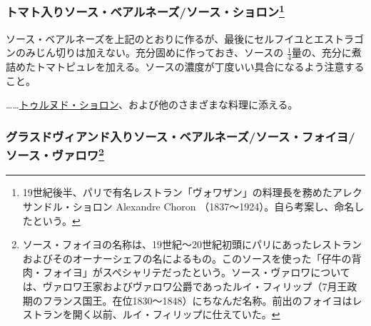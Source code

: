 \begin{recette}
\atoaki{}

\hypertarget{sauce-bearnaise-tomatee}{%
\subsubsection[トマト入りソース・ベアルネーズ/ソース・ショロン]{\texorpdfstring{トマト入りソース・ベアルネーズ/ソース・ショロン\footnote{19世紀後半、パリで有名レストラン「ヴォワザン」の料理長を務めたアレクサンドル・ショロン
  Alexandre Choron （1837〜1924）。自ら考案し、命名したという。}}{トマト入りソース・ベアルネーズ/ソース・ショロン}}\label{sauce-bearnaise-tomatee}}


 

ソース・ベアルネーズを上記のとおりに作るが、最後にセルフイユとエストラゴンのみじん切りは加えない。充分固めに作っておき、ソースの
\(\frac{1}{4}\)量の、充分に煮詰めたトマトピュレを加える。ソースの濃度が丁度いい具合になるよう注意すること。

\ldots{}\ldots{}\protect\hyperlink{tournedos-choron}{トゥルヌド・ショロン}、および他のさまざまな料理に添える。

\atoaki{}

\hypertarget{sauce-bearnaise-glace-de-viande}{%
\subsubsection[グラスドヴィアンド入りソース・ベアルネーズ/ソース・フォイヨ/ソース・ヴァロワ]{\texorpdfstring{グラスドヴィアンド入りソース・ベアルネーズ/ソース・フォイヨ/ソース・ヴァロワ\footnote{ソース・フォイヨの名称は、19世紀〜20世紀初頭にパリにあったレストランおよびそのオーナーシェフの名によるもの。このソースを使った「仔牛の背肉・フォイヨ」がスペシャリテだったという。ソース・ヴァロワについては、ヴァロワ王家およびヴァロワ公爵であったルイ・フィリップ（7月王政期のフランス国王。在位1830〜1848）にちなんだ名称。前出のフォイヨはレストランを開く以前、ルイ・フィリップに仕えていた。}}{グラスドヴィアンド入りソース・ベアルネーズ/ソース・フォイヨ/ソース・ヴァロワ}}\label{sauce-bearnaise-glace-de-viande}}


\end{recette}
